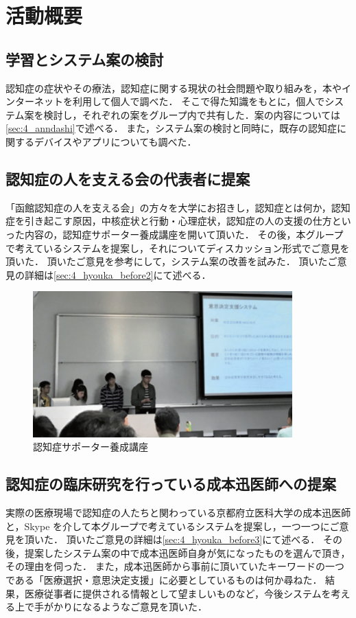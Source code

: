 \documentclass[../report]{subfiles}
\begin{document}
\section{活動概要}
\subsection{学習とシステム案の検討} \label{sec:discuss}
認知症の症状やその療法，認知症に関する現状の社会問題や取り組みを，本やインターネットを利用して個人で調べた．
そこで得た知識をもとに，個人でシステム案を検討し，それぞれの案をグループ内で共有した．案の内容については\ref{sec:4_anndashi}で述べる．
また，システム案の検討と同時に，既存の認知症に関するデバイスやアプリについても調べた．

\subsection{認知症の人を支える会の代表者に提案}
「函館認知症の人を支える会」の方々を大学にお招きし，認知症とは何か，認知症を引き起こす原因，中核症状と行動・心理症状，認知症の人の支援の仕方といった内容の，認知症サポーター養成講座を開いて頂いた．
その後，本グループで考えているシステムを提案し，それについてディスカッション形式でご意見を頂いた．
頂いたご意見を参考にして，システム案の改善を試みた．
頂いたご意見の詳細は\ref{sec:4_hyouka_before2}にて述べる．
\begin{figure}[htbp]
    \begin{center}
        \includegraphics[width=10cm]{imgs/2_idea_review1.png}
        \caption{認知症サポーター養成講座}
    \end{center}
\end{figure}

\subsection{認知症の臨床研究を行っている成本迅医師への提案}
実際の医療現場で認知症の人たちと関わっている京都府立医科大学の成本迅医師と，Skype を介して本グループで考えているシステムを提案し，一つ一つにご意見を頂いた．
頂いたご意見の詳細は\ref{sec:4_hyouka_before3}にて述べる．
その後，提案したシステム案の中で成本迅医師自身が気になったものを選んで頂き，その理由を伺った．
また，成本迅医師から事前に頂いていたキーワードの一つである「医療選択・意思決定支援」に必要としているものは何か尋ねた．
結果，医療従事者に提供される情報として望ましいものなど，今後システムを考える上で手がかりになるようなご意見を頂いた．
\end{document}
